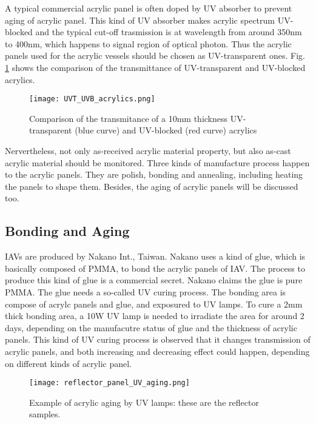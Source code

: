 A typical commercial acrylic panel is often doped by UV absorber
to prevent aging of acrylic panel. This kind of UV absorber makes acrylic spectrum
UV-blocked and the typical cut-off trasmission is at wavelength from around 350nm to 400nm,
which happens to signal region of optical photon.
Thus the acrylic panels used for the acrylic vessels should be chosen as
UV-transparent ones. Fig. \ref{UVTUVBAcrylics} shows the comparison of the transmittance of UV-transparent
and UV-blocked acrylics.


\begin{figure}
    \centering
    \texttt{[image: UVT\_UVB\_acrylics.png]}
    \caption{Comparison of the transmitance of a 10mm thickness UV-transparent (blue curve) and UV-blocked (red curve) acrylics}
    \label{UVTUVBAcrylics}
    \end{figure}



Nervertheless, not only as-received acrylic material property, but also as-cast
acrylic material should be monitored. Three kinds of manufacture process happen to the acrylic panels.
They are polish, bonding and annealing, including heating the panels to shape them. Besides,
the aging of acrylic panels will be discussed too.


\subsection {Bonding and Aging}

IAVs are produced by Nakano Int., Taiwan. Nakano uses a kind of glue, which is basically
composed of PMMA, to bond the acrylic panels of IAV. The process to produce this kind of glue is a commercial
secret. Nakano claims the glue is pure PMMA. The glue needs a so-called UV curing process. The bonding area
is compose of acrylc panels and glue, and exposured to UV lamps. To cure a 2mm thick bonding
area, a 10W UV lamp is needed to irradiate the area for around 2 days, depending on the manufacutre status of glue
and the thickness of acrylic panels. This kind of UV curing process is observed that it changes transmission of acrylic panels,
and both increasing and decreasing effect could happen, depending on different kinds of acrylic panel.


\begin{figure}
    \centering
    \texttt{[image: reflector\_panel\_UV\_aging.png]}
    \caption [Example of acrylic aging by UV lamps]
    {Example of acrylic aging by UV lamps: these are the reflector samples.\cite{DocDB:3691v1}}
    \label{ReflectorAging}
    \end{figure}



